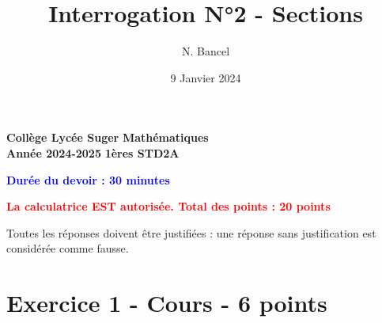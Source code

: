 \documentclass{exam}
\title{Interrogation N°2 - Sections}
\author{N. Bancel}
\date{9 Janvier 2024}
\begin{document}
\textbf{Collège Lycée Suger}
\hfill
\textbf{Mathématiques} \\

\textbf{Année 2024-2025}
\hfill
\textbf{1ères STD2A} \par

{\let\newpage\relax\maketitle}


  \begin{center}
    \textbf{\textcolor{blue}{Durée du devoir : 30 minutes}} \par
    \vspace{1em}
    \textbf{\textcolor{red}{La calculatrice EST autorisée. Total des points : 20 points}} \par
    \vspace{1em}
  \end{center}
  
  \begin{tcolorbox}[colback=gray!10!white, colframe=gray, title=Note importante]
    Toutes les réponses doivent être justifiées : une réponse sans justification est considérée comme fausse. \par
  \end{tcolorbox}

\section*{Exercice 1 - Cours - 6 points}
\end{document}
